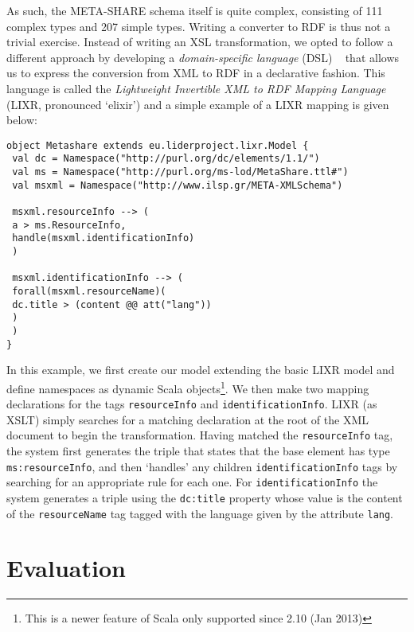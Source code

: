 \documentclass{acm_proc_article-sp}
\begin{document}
As such, the META-SHARE schema itself is quite complex, consisting of 111 complex types
and 207 simple types.
Writing a\textsc{} converter to RDF is thus not a trivial exercise. Instead of writing an
XSL transformation, we opted to follow a different approach by developing a
\emph{domain-specific language} (DSL) ~\cite{fowler2010domain} that allows us to express the conversion from XML to RDF in a declarative fashion.
This language is called the \textit{Lightweight Invertible XML to RDF Mapping
Language} (LIXR, pronounced `elixir') and a simple example of a
LIXR mapping is given below:
{\scriptsize
\begin{verbatim}
object Metashare extends eu.liderproject.lixr.Model {
 val dc = Namespace("http://purl.org/dc/elements/1.1/")
 val ms = Namespace("http://purl.org/ms-lod/MetaShare.ttl#")
 val msxml = Namespace("http://www.ilsp.gr/META-XMLSchema")

 msxml.resourceInfo --> (
 a > ms.ResourceInfo,
 handle(msxml.identificationInfo)
 )

 msxml.identificationInfo --> (
 forall(msxml.resourceName)(
 dc.title > (content @@ att("lang"))
 )
 )
}
\end{verbatim}}
In this example, we first create our model extending the basic LIXR model and
define namespaces as dynamic Scala objects\footnote{This is a newer feature of
Scala only supported since 2.10 (Jan 2013)}. We then make two mapping
declarations for the tags {\tt resourceInfo} and {\tt identificationInfo}. LIXR (as
XSLT) simply searches for a matching declaration at the root of the XML document
to begin the transformation. Having matched the {\tt resourceInfo} tag, the system
first generates the triple that states that the base element has type
{\tt ms:resourceInfo}, and then `handles' any children {\tt identificationInfo} tags by
searching for an appropriate rule for each one. For {\tt identificationInfo} the
system generates a triple using the {\tt dc:title} property whose value is the
content of the {\tt resourceName} tag tagged with the language given by the
attribute {\tt lang}.


\section{Evaluation}
\label{sec:evaluation}
\end{document}
